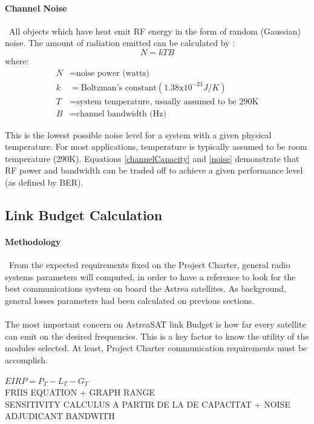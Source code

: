 \paragraph{Channel Noise}\
All objects which have heat emit RF energy in the form of random (Gaussian) noise. The amount of radiation emitted can be calculated by \cite{Note1998}:
\begin{equation}
N=kTB
\label{noise}
\end{equation}
where:
\begin{align*}
	N&= \text{noise power (watts)}\\
	k&= \text{Boltzman's constant}(1.38\mathrm{x}10^{-23}J/K)\\
	T&= \text{system temperature, usually assumed to be 290K}\\
	B&= \text{channel bandwidth (Hz)}
\end{align*}

This is the lowest possible noise level for a system with a given physical temperature. For most applications, temperature is typically assumed to be room temperature (290K). Equations \ref{channelCapacity} and \ref{noise} demonstrate that RF power and bandwidth can be traded off to achieve a given performance level (as defined by BER). \cite{Note1998}

\subsection{Link Budget Calculation}
\paragraph{Methodology} \ From the expected requirements fixed on the Project Charter, general radio systems parameters will computed, in order to have a reference to look for the best communications system on board the Astrea satellites. As background, general losses parameters had been calculated on previous sections. 

\paragraph{} The most important concern on AstreaSAT link Budget is how far every satellite can emit on the desired frequencies. This is a key factor to know the utility of the modules selected. At least, Project Charter communication requirements must be accomplish.
 
$EIRP=P_T-L_T-G_T$\\
FRIIS EQUATION + GRAPH RANGE\\
SENSITIVITY CALCULUS A PARTIR DE LA DE CAPACITAT + NOISE ADJUDICANT BANDWITH
